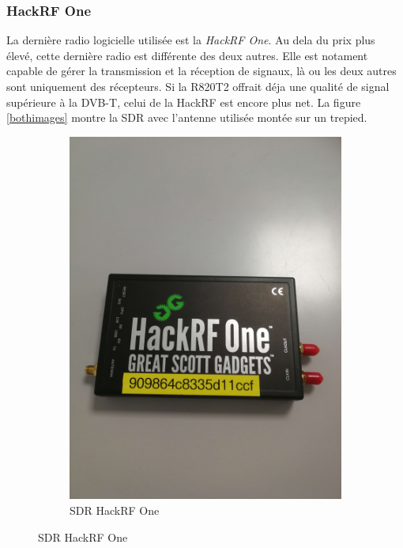 \subsubsection{HackRF One}

La dernière radio logicielle utilisée est la \textit{HackRF One}. Au dela du prix plus élevé, cette dernière radio est différente des deux autres. Elle est notament capable de gérer la transmission et la réception de signaux, là ou les deux autres sont uniquement des récepteurs. Si la R820T2 offrait déja une qualité de signal supérieure à la DVB-T, celui de la HackRF est encore plus net. La figure \ref{bothimages} montre la SDR avec l'antenne utilisée montée sur un trepied.

\begin{figure}[h]
\centering
\begin{subfigure}{0.4\textwidth}
  \centering
  \includegraphics[width=\textwidth]{images/hackrf.png}
  \caption{SDR HackRF One}
  \label{term330}
\end{subfigure}

\end{figure}
